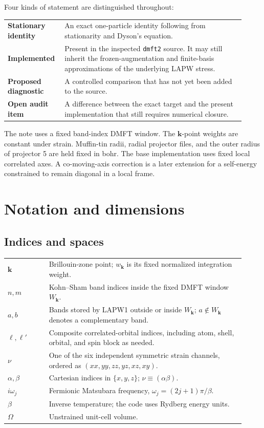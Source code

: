 \documentclass[11pt]{article}
\numberwithin{equation}{section}
\newcommand{\kb}{\mathbf k}
\newcommand{\code}[1]{\texttt{#1}}
\begin{document}
Four kinds of statement are distinguished throughout:

\begin{longtable}{>{\bfseries}p{0.20\linewidth}p{0.72\linewidth}}
\toprule
Stationary identity & An exact one-particle identity following from stationarity and Dyson's equation.\\
Implemented & Present in the inspected \code{dmft2} source.  It may still inherit the frozen-augmentation and finite-basis approximations of the underlying LAPW stress.\\
Proposed diagnostic & A controlled comparison that has not yet been added to the source.\\
Open audit item & A difference between the exact target and the present implementation that still requires numerical closure.\\
\bottomrule
\end{longtable}

The note uses a fixed band-index DMFT window.  The $\kb$-point weights are
constant under strain.  Muffin-tin radii, radial projector files, and the outer
radius of projector 5 are held fixed in bohr.  The base implementation uses
fixed local correlated axes.  A co-moving-axis correction is a later extension
for a self-energy constrained to remain diagonal in a local frame.

\section{Notation and dimensions}

\subsection{Indices and spaces}

\begin{longtable}{>{$}p{0.16\linewidth}<{$}p{0.76\linewidth}}
\toprule
\kb & Brillouin-zone point; $w_{\kb}$ is its fixed normalized integration weight.\\
n,m & Kohn--Sham band indices inside the fixed DMFT window $W_{\kb}$.\\
a,b & Bands stored by LAPW1 outside or inside $W_{\kb}$; $a\notin W_{\kb}$ denotes a complementary band.\\
\ell,\ell' & Composite correlated-orbital indices, including atom, shell, orbital, and spin block as needed.\\
\nu & One of the six independent symmetric strain channels, ordered as $(xx,yy,zz,yz,xz,xy)$.\\
\alpha,\beta & Cartesian indices in $\{x,y,z\}$; $\nu\equiv(\alpha\beta)$.\\
i\omega_j & Fermionic Matsubara frequency, $\omega_j=(2j+1)\pi/\beta$.\\
\beta & Inverse temperature; the code uses Rydberg energy units.\\
\Omega & Unstrained unit-cell volume.\\
\bottomrule
\end{longtable}
\end{document}
